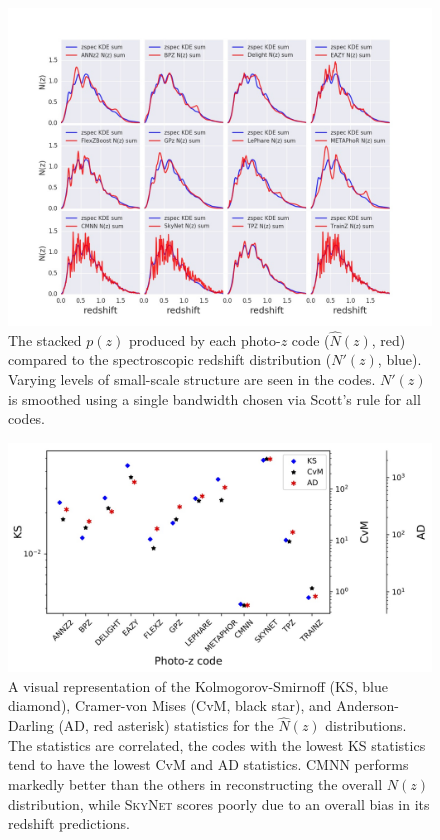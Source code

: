 \documentclass[usenatbib]{mn2e}
\newcommand{\aim}[1]{\textcolor{green}{#1}}%
\newcommand{\scc}[1]{\textcolor{scc}{#1}}%
\begin{document}
\begin{figure}
\centering
\includegraphics[width=\textwidth]{figures/NZsumplot_12codes.jpg}
\caption{The stacked $p(z)$ produced by each photo-$z$ code ($\hat{N}(z)$, red) compared to the spectroscopic redshift distribution ($N'(z)$, blue).  Varying levels of small-scale structure are seen in the codes.  $N'(z)$ is smoothed using a single bandwidth chosen via Scott's rule for all codes.} \label{fig:nz}
\end{figure}

\begin{figure}
\centering
\includegraphics[width=\textwidth]{figures/KSvsCvMvsAD_NZ_withnull_jpg.jpg}
\caption{A visual representation of the Kolmogorov-Smirnoff (KS, blue diamond), Cramer-von Mises (CvM, black star), and Anderson-Darling (AD, red asterisk) statistics for the $\hat{N}(z)$ distributions. The statistics are correlated, the codes with the lowest KS statistics tend to have the lowest CvM and AD statistics.  \textsc{CMNN} performs markedly better than the others in reconstructing the overall $N(z)$ distribution, while \textsc{SkyNet} scores poorly due to an overall bias in its redshift predictions.} \label{fig:nz_stats}
\end{figure}
\end{document}
